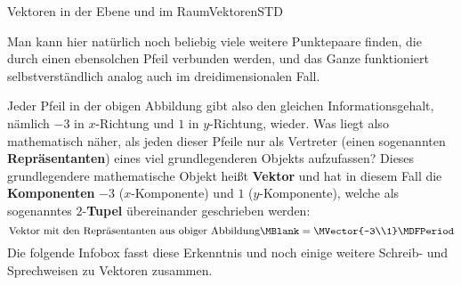 \begin{MXContent}{Vektoren in der Ebene und im Raum}{Vektoren}{STD}
\begin{center}
{
} 
\end{center}

Man kann hier natürlich noch beliebig viele weitere Punktepaare finden, die durch einen ebensolchen Pfeil verbunden werden, und das Ganze funktioniert selbstverständlich analog auch im dreidimensionalen Fall. 

Jeder Pfeil in der obigen Abbildung gibt also den gleichen Informationsgehalt, nämlich $-3$ in $x$-Richtung und $1$ in $y$-Richtung, wieder. Was liegt also mathematisch näher, als jeden dieser Pfeile nur als Vertreter (einen sogenannten \textbf{Repräsentanten}) eines viel grundlegenderen Objekts aufzufassen? Dieses grundlegendere mathematische Objekt heißt \textbf{Vektor} und hat in diesem Fall die \textbf{Komponenten} $-3$ ($x$-Komponente) und $1$ ($y$-Komponente), welche als sogenanntes $2$-\textbf{Tupel} übereinander geschrieben werden:
\[
 \textrm{Vektor mit den Repräsentanten aus obiger Abbildung}\MBlank = \MVector{-3\\1}\MDFPeriod
\]
Die folgende Infobox fasst diese Erkenntnis und noch einige weitere Schreib- und Sprechweisen zu Vektoren zusammen.


\end{MXContent}
